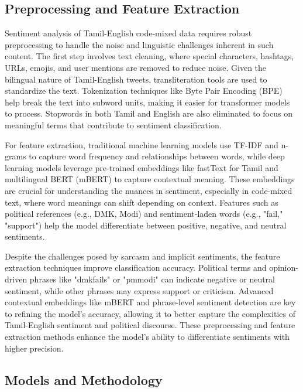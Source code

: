 \documentclass[11pt]{article}
\begin{document}
\subsection{Preprocessing and Feature Extraction}
Sentiment analysis of Tamil-English code-mixed data requires robust preprocessing to handle the noise and linguistic challenges inherent in such content. The first step involves text cleaning, where special characters, hashtags, URLs, emojis, and user mentions are removed to reduce noise. Given the bilingual nature of Tamil-English tweets, transliteration tools are used to standardize the text. Tokenization techniques like Byte Pair Encoding (BPE) help break the text into subword units, making it easier for transformer models to process. Stopwords in both Tamil and English are also eliminated to focus on meaningful terms that contribute to sentiment classification.

For feature extraction, traditional machine learning models use TF-IDF and n-grams to capture word frequency and relationships between words, while deep learning models leverage pre-trained embeddings like fastText for Tamil and multilingual BERT (mBERT) to capture contextual meaning. These embeddings are crucial for understanding the nuances in sentiment, especially in code-mixed text, where word meanings can shift depending on context. Features such as political references (e.g., DMK, Modi) and sentiment-laden words (e.g., "fail," "support") help the model differentiate between positive, negative, and neutral sentiments.

Despite the challenges posed by sarcasm and implicit sentiments, the feature extraction techniques improve classification accuracy. Political terms and opinion-driven phrases like "dmkfails" or "pmmodi" can indicate negative or neutral sentiment, while other phrases may express support or criticism. Advanced contextual embeddings like mBERT and phrase-level sentiment detection are key to refining the model's accuracy, allowing it to better capture the complexities of Tamil-English sentiment and political discourse. These preprocessing and feature extraction methods enhance the model's ability to differentiate sentiments with higher precision.


\subsection{Models and Methodology}
\end{document}
